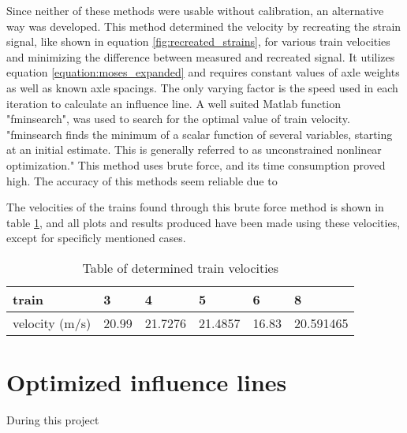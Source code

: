 Since neither of these methods were usable without calibration, an alternative way was developed. This method determined the velocity by recreating the strain signal, like shown in equation  \ref{fig:recreated_strains}, for various train velocities and minimizing the difference between measured and recreated signal. It utilizes equation \ref{equation:moses_expanded} and requires constant values of axle weights as well as known axle spacings. The only varying factor is the speed used in each iteration to calculate an influence line. A well suited Matlab function "fminsearch", was used to search for the optimal value of train velocity. "fminsearch finds the minimum of a scalar function of several variables, starting at an initial estimate. This is generally referred to as unconstrained nonlinear optimization." This method uses brute force, and its time consumption proved high. The accuracy of this methods seem reliable due to

The velocities of the trains found through this brute force method is shown in table \ref{table:speeds}, and all plots and results produced have been made using these velocities, except for specificly mentioned cases.
\begin{table}[h]
	\centering
	\begin{tabularx}{\textwidth}{ |X|X|X|X|X|X| }
		\hline
		train & 3 & 4 & 5 & 6 & 8 \\
		\hline
		velocity (m/s) & 20.99 & 21.7276	&21.4857 & 16.83 &	20.591465  \\
		\hline
	\end{tabularx}
	\caption{Table of determined train velocities}
	\label{table:speeds}
\end{table}


\section{Optimized influence lines}
During this project



